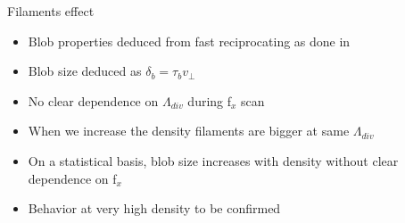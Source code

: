 \documentclass[10pt, compress]{beamer}
\newcommand\Fontvi{\fontsize{8}{7.2}\selectfont}
\begin{document}
\begin{frame}{Filaments effect}
  \vspace{-1cm}
\Fontvi
      \begin{itemize}
      \item<1-3> Blob properties deduced from fast reciprocating as done in \parencite{Boedo:2001tt}
      \item<1|only@1> Blob size deduced as $\delta_b = \tau_b v_{\perp}$
      \item<2-3> No clear dependence on
          $\Lambda_{div}$ during f$_x$ scan
      \item<3> \textcolor{ta3chameleon}{When we increase the
          density filaments are bigger at same $\Lambda_{div}$}
      \item<4-> \textcolor{ta3skyblue}{On a statistical basis,
          blob size increases with density without clear dependence on
          f$_x$ }
      \item<6> \textcolor{ta3chameleon}{Behavior at very high
          density to be confirmed}  
      \end{itemize}
\end{frame}
\end{document}
